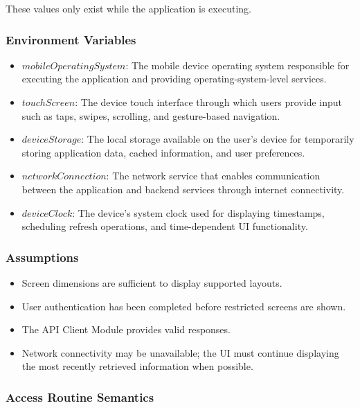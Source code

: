 \documentclass[12pt, titlepage]{article}
\begin{document}
\noindent These values only exist while the application is executing.

\subsubsection{Environment Variables}

\begin{itemize}
  \item $\mathit{mobileOperatingSystem}$: The mobile device operating system responsible for executing the application and providing operating-system-level services.
  \item $\mathit{touchScreen}$: The device touch interface through which users provide input such as taps, swipes, scrolling, and gesture-based navigation.
  \item $\mathit{deviceStorage}$: The local storage available on the user's device for temporarily storing application data, cached information, and user preferences.
  \item $\mathit{networkConnection}$: The network service that enables communication between the application and backend services through internet connectivity.
  \item $\mathit{deviceClock}$: The device's system clock used for displaying timestamps, scheduling refresh operations, and time-dependent UI functionality.
\end{itemize}

\subsubsection{Assumptions}

\begin{itemize}
  \item Screen dimensions are sufficient to display supported layouts.
  \item User authentication has been completed before restricted screens are shown.
  \item The API Client Module provides valid responses.
  \item Network connectivity may be unavailable; the UI must continue displaying the most recently retrieved information when possible.
\end{itemize}

\subsubsection{Access Routine Semantics}
\end{document}
